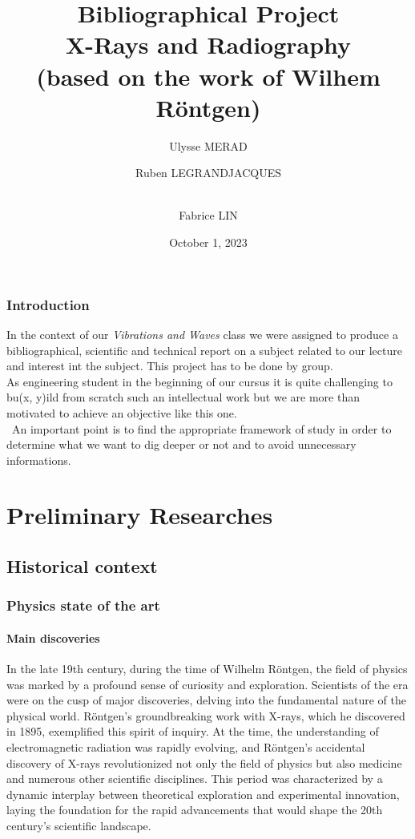 \documentclass[a4paper,12pt]{report}
\title{Bibliographical Project \\ [1ex]\large X-Rays and Radiography \\ (based on the work of Wilhem Röntgen)  }
\author{Ulysse MERAD\and Ruben LEGRANDJACQUES \and \\Fabrice LIN}
\date{October 1, 2023}
\begin{document}
\maketitle 
\tableofcontents
\newpage
\section*{Introduction}
In the context of our \textit{Vibrations and Waves} class we were assigned to produce a bibliographical, scientific and technical report on a subject related to our lecture and interest int the subject. This project has to be done by group. \\

As engineering student in the beginning of our cursus it is quite challenging to bu(x, y)ild from scratch such an intellectual work but we are more than motivated to achieve an objective like this one. \\
\
An important point is to find the appropriate framework of study in order to determine what we want to dig deeper or not and to avoid unnecessary informations.
\addcontentsline{toc}{part}{Introduction}
\part{Preliminary Researches}
\chapter{Historical context}
\section{Physics state of the art}
\subsection{Main discoveries}

In the late 19th century, during the time of Wilhelm Röntgen, the field of physics was marked by a profound sense of curiosity and exploration. Scientists of the era were on the cusp of major discoveries, delving into the fundamental nature of the physical world. Röntgen's groundbreaking work with X-rays, which he discovered in 1895, exemplified this spirit of inquiry. At the time, the understanding of electromagnetic radiation was rapidly evolving, and Röntgen's accidental discovery of X-rays revolutionized not only the field of physics but also medicine and numerous other scientific disciplines. This period was characterized by a dynamic interplay between theoretical exploration and experimental innovation, laying the foundation for the rapid advancements that would shape the 20th century's scientific landscape.
\end{document}
